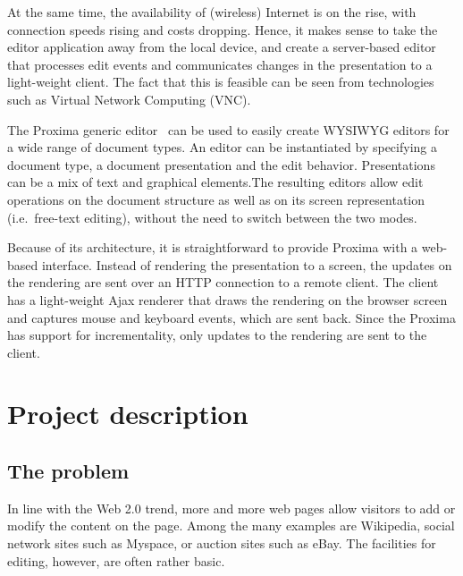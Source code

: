 \documentclass[10pt]{article}
\begin{document}
At the same time, the availability of (wireless) Internet is on the rise, with connection speeds rising and costs dropping. Hence, it makes sense to take the editor application away from the local device, and create a server-based editor that processes edit events and communicates changes in the presentation to a light-weight client. The fact that this is feasible can be seen from technologies such as Virtual Network Computing (VNC).

The Proxima generic editor~\cite{schrage08proximaHome, schrage04proxima} can be used to easily create WYSIWYG editors for a wide range of document types. An editor can be instantiated by specifying a document type, a document presentation and the edit behavior. Presentations can be a mix of text and graphical elements.The resulting editors allow edit operations on the document structure as well as on its screen representation (i.e.\ free-text editing), without the need to switch between the two modes.

Because of its architecture, it is straightforward to provide Proxima with a web-based interface. Instead of rendering the presentation to a screen, the updates on the rendering are sent over an HTTP connection to a remote client. The client has a light-weight Ajax renderer that draws the rendering on the browser screen and captures mouse and keyboard events, which are sent back. Since the Proxima has support for incrementality, only updates to the rendering are sent to the client.

\ec



\section{Project description}

\subsection{The problem} 

In line with the Web 2.0 trend, more and more web pages allow visitors to add or modify the content on the page. Among the many examples are Wikipedia, social network sites such as Myspace, or auction sites such as eBay. The facilities for editing, however, are often rather basic. 
\end{document}
